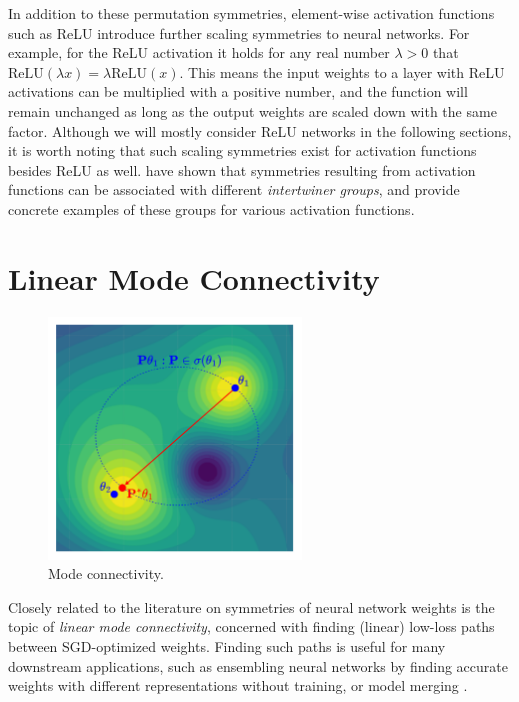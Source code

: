 In addition to these permutation symmetries, element-wise activation functions such as ReLU introduce further scaling symmetries to neural networks. For example, for the ReLU activation it holds for any real number $\lambda > 0$ that $\text{ReLU}(\lambda x) = \lambda \text{ReLU}(x)$. This means the input weights to a layer with ReLU activations can be multiplied with a positive number, and the function will remain unchanged as long as the output weights are scaled down with the same factor. Although we will mostly consider ReLU networks in the following sections, it is worth noting that such scaling symmetries exist for activation functions besides ReLU as well. \citep{godfreySymmetriesDeepLearning2022} have shown that symmetries resulting from activation functions can be associated with different \textit{intertwiner groups}, and provide concrete examples of these groups for various activation functions. 

\section{Linear Mode Connectivity}

\begin{figure}[t!]
    \centering
    \includegraphics[width=0.6\textwidth]{figures/mode_connectivity.drawio.pdf}
    \caption{\label{fig:mode_conn} Mode connectivity.}    
\end{figure}


Closely related to the literature on symmetries of neural network weights is the topic of \textit{linear mode connectivity}, concerned with finding (linear) low-loss paths between SGD-optimized weights. Finding such paths is useful for many downstream applications, such as ensembling neural networks \citep{garipovLossSurfacesMode2018a} by finding accurate weights with different representations without training, or model merging \citep{stoicaZipItMergingModels2024}.

